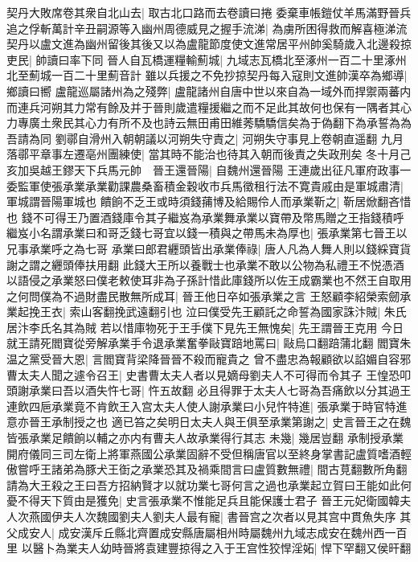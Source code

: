 契丹大敗席卷其衆自北山去|{
	取古北口路而去卷讀曰捲}
委棄車帳鎧仗羊馬滿野晉兵追之俘斬萬計辛丑嗣源等入幽州周德威見之握手流涕|{
	為虜所困得救而解喜極涕流}
契丹以盧文進為幽州留後其後又以為盧龍節度使文進常居平州帥奚騎歲入北邊殺掠吏民|{
	帥讀曰率下同}
晉人自瓦橋運糧輸薊城|{
	九域志瓦橋北至涿州一百二十里涿州北至薊城一百二十里薊音計}
雖以兵援之不免抄掠契丹每入寇則文進帥漢卒為鄉導|{
	鄉讀曰嚮}
盧龍巡屬諸州為之殘弊|{
	盧龍諸州自唐中世以來自為一域外而捍禦兩蕃内而連兵河朔其力常有餘及并于晉則歲遣糧援繼之而不足此其故何也保有一隅者其心力專廣土衆民其心力有所不及也詩云無田甫田維莠驕驕信矣為于偽翻下為承誓為為吾請為同}
劉鄩自滑州入朝朝議以河朔失守責之|{
	河朔失守事見上卷朝直遥翻}
九月落鄩平章事左遷亳州團練使|{
	當其時不能治也待其入朝而後責之失政刑矣}
冬十月己亥加吳越王鏐天下兵馬元帥　晉王還晉陽|{
	自魏州還晉陽}
王連歲出征凡軍府政事一委監軍使張承業承業勸課農桑畜積金穀收市兵馬徵租行法不寛貴戚由是軍城肅清|{
	軍城謂晉陽軍城也}
饋餉不乏王或時須錢蒱博及給賜伶人而承業靳之|{
	靳居焮翻吝惜也}
錢不可得王乃置酒錢庫令其子繼岌為承業舞承業以寶帶及幣馬贈之王指錢積呼繼岌小名謂承業曰和哥乏錢七哥宜以錢一積與之帶馬未為厚也|{
	張承業第七晉王以兄事承業呼之為七哥}
承業曰郎君纒頭皆出承業俸祿|{
	唐人凡為人舞人則以錢綵寶貨謝之謂之纒頭俸扶用翻}
此錢大王所以養戰士也承業不敢以公物為私禮王不悦憑酒以語侵之承業怒曰僕老敕使耳非為子孫計惜此庫錢所以佐王成霸業也不然王自取用之何問僕為不過財盡民散無所成耳|{
	晉王他日卒如張承業之言}
王怒顧李紹榮索劒承業起挽王衣|{
	索山客翻挽武遠翻引也}
泣曰僕受先王顧託之命誓為國家誅汴賊|{
	朱氏居汴李氏名其為賊}
若以惜庫物死于王手僕下見先王無愧矣|{
	先王謂晉王克用}
今日就王請死閻寶從旁解承業手令退承業奮拳敺寶踣地罵曰|{
	敺烏口翻踣蒲北翻}
閻寶朱温之黨受晉大恩|{
	言閻寶背梁降晉晉不殺而寵貴之}
曾不盡忠為報顧欲以諂媚自容邪曹太夫人聞之遽令召王|{
	史書曹太夫人者以見嫡母劉夫人不可得而令其子}
王惶恐叩頭謝承業曰吾以酒失忤七哥|{
	忤五故翻}
必且得罪于太夫人七哥為吾痛飲以分其過王連飲四巵承業竟不肯飲王入宫太夫人使人謝承業曰小兒忤特進|{
	張承業于時官特進意亦晉王承制授之也}
適已笞之矣明日太夫人與王俱至承業第謝之|{
	史言晉王之在魏皆張承業足饋餉以輔之亦内有曹夫人故承業得行其志}
未幾|{
	幾居豈翻}
承制授承業開府儀同三司左衛上將軍燕國公承業固辭不受但稱唐官以至終身掌書記盧質嗜酒輕傲嘗呼王諸弟為豚犬王衘之承業恐其及禍乘間言曰盧質數無禮|{
	間古莧翻數所角翻}
請為大王殺之王曰吾方招納賢才以就功業七哥何言之過也承業起立賀曰王能如此何憂不得天下質由是獲免|{
	史言張承業不惟能足兵且能保護士君子}
晉王元妃衛國韓夫人次燕國伊夫人次魏國劉夫人劉夫人最有寵|{
	書晉宫之次者以見其宫中貫魚失序}
其父成安人|{
	成安漢斥丘縣北齊置成安縣唐屬相州時屬魏州九域志成安在魏州西一百里}
以醫卜為業夫人幼時晉將袁建豐掠得之入于王宫性狡悍淫妬|{
	悍下罕翻又侯旰翻}
